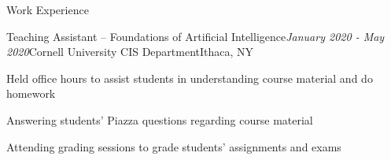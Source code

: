 \documentclass{resume} %
\begin{document}
\begin{rSection}{Work Experience}
\begin{rSubsection}{Teaching Assistant -- Foundations of Artificial Intelligence}{\em January 2020 - May 2020}{Cornell University CIS Department}{Ithaca, NY}
\item Held office hours to assist students in understanding course material and do homework
\item Answering students' Piazza questions regarding course material
\item Attending grading sessions to grade students' assignments and exams
\end{rSubsection}

\end{rSection}

%
%
%
%
\end{document}
